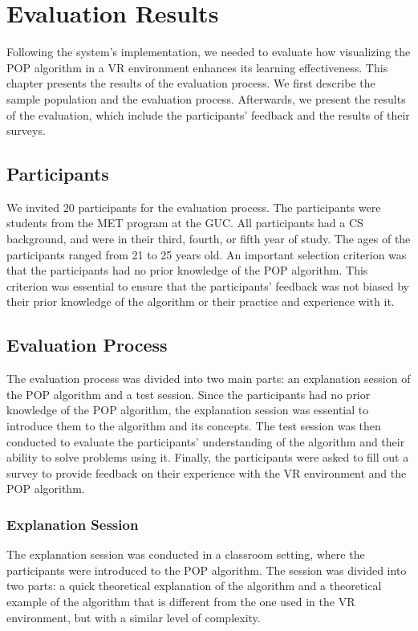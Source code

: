 \chapter{Evaluation Results} \label{chap:evaluation_results}

Following the system's implementation, we needed to evaluate how visualizing the \acf{POP} algorithm in a \ac{VR} environment enhances its learning effectiveness. This chapter presents the results of the evaluation process. We first describe the sample population and the evaluation process. Afterwards, we present the results of the evaluation, which include the participants' feedback and the results of their surveys.

\section{Participants}

We invited 20 participants for the evaluation process. The participants were students from the \acf{MET} program at the \acf{GUC}. All participants had a \ac{CS} background, and were in their third, fourth, or fifth year of study. The ages of the participants ranged from 21 to 25 years old. An important selection criterion was that the participants had no prior knowledge of the \ac{POP} algorithm. This criterion was essential to ensure that the participants' feedback was not biased by their prior knowledge of the algorithm or their practice and experience with it.

\section{Evaluation Process}

The evaluation process was divided into two main parts: an explanation session of the \ac{POP} algorithm and a test session. Since the participants had no prior knowledge of the \ac{POP} algorithm, the explanation session was essential to introduce them to the algorithm and its concepts. The test session was then conducted to evaluate the participants' understanding of the algorithm and their ability to solve problems using it. Finally, the participants were asked to fill out a survey to provide feedback on their experience with the \ac{VR} environment and the \ac{POP} algorithm.

\subsection{Explanation Session}
The explanation session was conducted in a classroom setting, where the participants were introduced to the \ac{POP} algorithm. The session was divided into two parts: a quick theoretical explanation of the algorithm and a theoretical example of the algorithm that is different from the one used in the \ac{VR} environment, but with a similar level of complexity.

